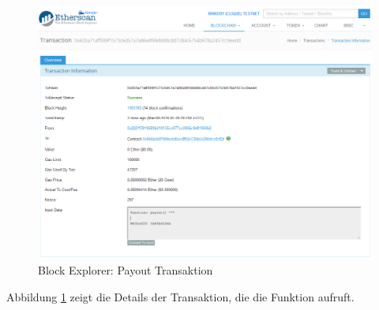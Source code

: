\begin{figure}[H]
\centering
\includegraphics[width=1\linewidth]{Figures/eth_gui/contract_payout_txn}
\decoRule
\caption{Block Explorer: Payout Transaktion}
\label{fig:contract_payout_txn}
\end{figure}

\noindent Abbildung \ref{fig:contract_payout_txn} zeigt die Details der Transaktion, die die  Funktion aufruft.
